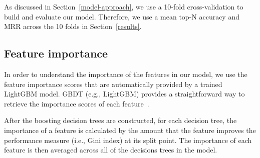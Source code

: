 As discussed in Section~\ref{model-approach}, we use a 10-fold cross-validation to build and evaluate our model. 
Therefore, we use a mean top-N accuracy and MRR across the 10 folds in Section~\ref{results}.
 

\subsection{Feature importance}

In order to understand the importance of the features in our model, we use the feature importance scores that are automatically provided by a trained LightGBM model.
GBDT (e.g., LightGBM) provides a straightforward way to retrieve the importance scores of each feature~\cite{friedman2001elements}.

After the boosting decision trees are constructed, for each decision tree, the importance of a feature is calculated by the amount that the feature improves the performance measure (i.e., Gini index) at its split point.
The importance of each feature is then averaged across all of the decisions trees in the model. 

